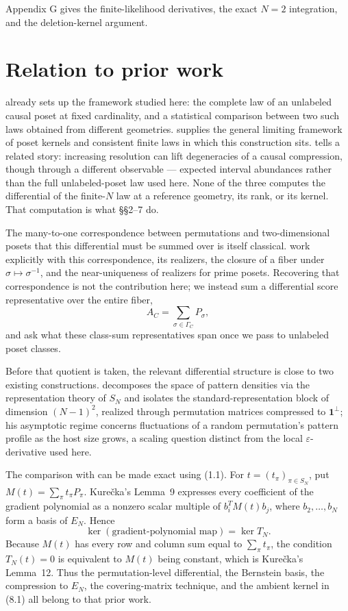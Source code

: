 \documentclass[11pt]{article}
\begin{document}
Appendix G gives the finite-likelihood derivatives, the exact \(N=2\) integration, and the deletion-kernel argument.

\section{Relation to prior work}

\citet{Bombelli2000} already sets up the framework studied here: the complete law of an unlabeled causal poset at fixed cardinality, and a statistical comparison between two such laws obtained from different geometries. \citet{Janson2011} supplies the general limiting framework of poset kernels and consistent finite laws in which this construction sits. \citet{Surya2026} tells a related story: increasing resolution can lift degeneracies of a causal compression, though through a different observable --- expected interval abundances rather than the full unlabeled-poset law used here. None of the three computes the differential of the finite-$N$ law at a reference geometry, its rank, or its kernel. That computation is what \S\S2--7 do.

The many-to-one correspondence between permutations and two-dimensional posets that this differential must be summed over is itself classical. \citet{BayoumiElZaharKhamis1994} work explicitly with this correspondence, its realizers, the closure of a fiber under $\sigma\mapsto\sigma^{-1}$, and the near-uniqueness of realizers for prime posets. Recovering that correspondence is not the contribution here; we instead sum a differential score representative over the entire fiber, \[ A_C=\sum_{\sigma\in\Gamma_C}P_\sigma, \] and ask what these class-sum representatives span once we pass to unlabeled poset classes.

Before that quotient is taken, the relevant differential structure is close to two existing constructions. \citet{EvenZohar2020} decomposes the space of pattern densities via the representation theory of $S_N$ and isolates the standard-representation block of dimension $(N-1)^2$, realized through permutation matrices compressed to $\mathbf1^\perp$; his asymptotic regime concerns fluctuations of a random permutation's pattern profile as the host size grows, a scaling question distinct from the local $\varepsilon$-derivative used here.

The comparison with \citet{Kurecka2022} can be made exact using (1.1). For $t=(t_\pi)_{\pi\in S_N}$, put $M(t)=\sum_\pi t_\pi P_\pi$. Kure\v{c}ka's Lemma~9 expresses every coefficient of the gradient polynomial as a nonzero scalar multiple of $b_i^TM(t)b_j$, where $b_2,\ldots,b_N$ form a basis of $E_N$. Hence
\[
\ker(\text{gradient-polynomial map})=\ker T_N.
\tag{8.1}
\]
Because $M(t)$ has every row and column sum equal to $\sum_\pi t_\pi$, the condition $T_N(t)=0$ is equivalent to $M(t)$ being constant, which is Kure\v{c}ka's Lemma~12. Thus the permutation-level differential, the Bernstein basis, the compression to $E_N$, the covering-matrix technique, and the ambient kernel in (8.1) all belong to that prior work.
\end{document}
